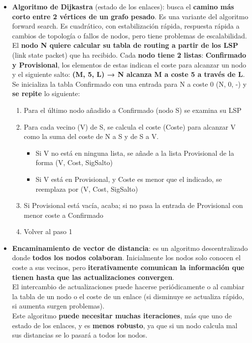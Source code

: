\documentclass{article}
\begin{document}
\begin{itemize}
    \item \textbf{Algoritmo de Dijkastra} (estado de los enlaces): busca el \textbf{camino más corto entre 2 vértices de un grafo pesado}. Es una variante del algoritmo forward search. Es cuadrático, con estabilización rápida, respuesta rápida a cambios de topología o fallos de nodos, pero tiene problemas de escalabilidad. \\
    El \textbf{nodo N quiere calcular su tabla de routing a partir de los LSP} (link state packet) que ha recibido. Cada \textbf{nodo tiene 2 listas}: \textbf{Confirmado y Provisional}, los elementos de estas indican el coste para alcanzar un nodo y el siguiente salto: \textbf{(M, 5, L) → N alcanza M a coste 5 a través de L}. \\
    Se inicializa la tabla Confirmado con una entrada para N a coste 0 (N, 0, -) y \textbf{se repite} lo siguiente: \\
    \begin{enumerate}
        \item Para el último nodo añadido a Confirmado (nodo S) se examina su LSP
        \item Para cada vecino (V) de S, se calcula el coste (Coste) para alcanzar V como la suma del coste de N a S y de S a V.
            \begin{itemize}
                \item Si V no está en ninguna lista, se añade a la lista Provisional de la forma (V, Cost, SigSalto)
                \item Si V está en Provisional, y Coste es menor que el indicado, se reemplaza por (V, Cost, SigSalto)
            \end{itemize}
        \item Si Provisional está vacía, acaba; si no pasa la entrada de Provisional con menor coste a Confirmado
        \item Volver al paso 1
    \end{enumerate}

    \item \textbf{Encaminamiento de vector de distancia}: es un algoritmo descentralizado donde \textbf{todos los nodos colaboran}. Inicialmente los nodos solo conocen el coste a sus vecinos, pero \textbf{iterativamente comunican la información que tienen hasta que las actualizaciones convergen}. \\
    El intercambio de actualizaciones puede hacerse periódicamente o al cambiar la tabla de un nodo o el coste de un enlace (si disminuye se actualiza rápido, si aumenta surgen problemas). \\
    Este algoritmo \textbf{puede necesitar muchas iteraciones}, más que uno de estado de los enlaces, y es \textbf{menos robusto}, ya que si un nodo calcula mal sus distancias se lo pasará a todos los nodos.


\end{itemize}
\end{document}

